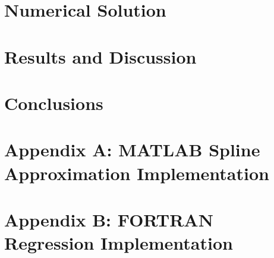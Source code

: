 \documentclass[12pt, letterpaper]{article} %
\begin{document}
\section*{Numerical Solution}

\section*{Results and Discussion}

\section*{Conclusions}

\section*{Appendix A: MATLAB Spline Approximation Implementation}

\section*{Appendix B: FORTRAN Regression Implementation}
\end{document}
